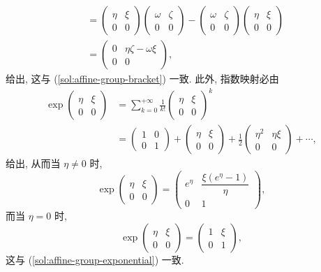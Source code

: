 \begin{description}[font=\normalfont,leftmargin=2em,labelwidth=1.5em]
\begin{enumerate}[label=(\alph*),ref=\alph*,leftmargin=*]
\begin{align*}
  &=\begin{pmatrix}\eta&\xi\\0&0\end{pmatrix}\begin{pmatrix}\omega&\zeta\\0&0\end{pmatrix}
    -\begin{pmatrix}\omega&\zeta\\0&0\end{pmatrix}\begin{pmatrix}\eta&\xi\\0&0\end{pmatrix}\\
  &=\begin{pmatrix}0&\eta\zeta-\omega\xi\\0&0\end{pmatrix},
\end{align*}
给出, 这与 (\ref{sol:affine-group-bracket}) 一致. 此外, 指数映射必由
\begin{align*}
  \exp\begin{pmatrix}\eta&\xi\\0&0\end{pmatrix}
  &=\sum_{k=0}^{+\infty}\frac{1}{k!}\begin{pmatrix}\eta&\xi\\0&0\end{pmatrix}^k\\
  &=\begin{pmatrix}1&0\\0&1\end{pmatrix}+\begin{pmatrix}\eta&\xi\\0&0\end{pmatrix}
      +\frac12\begin{pmatrix}\eta^2&\eta\xi\\0&0\end{pmatrix}+\cdots,
\end{align*}
给出, 从而当 $\eta\ne0$ 时,
\[
  \exp\begin{pmatrix}\eta&\xi\\0&0\end{pmatrix}
  =\begin{pmatrix}e^\eta&\dfrac{\xi(e^\eta-1)}{\eta}\\0&1\end{pmatrix},
\]
而当 $\eta=0$ 时,
\[
  \exp\begin{pmatrix}\eta&\xi\\0&0\end{pmatrix}=\begin{pmatrix}1&\xi\\0&1\end{pmatrix},
\]
这与 (\ref{sol:affine-group-exponential}) 一致.
\end{enumerate}


\end{description}
